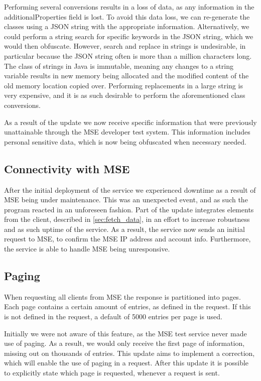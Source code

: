 Performing several conversions results in a loss of data, as any information in the additionalProperties field is lost. To avoid this data loss, we can re-generate the classes using a JSON string with the appropriate information. Alternatively, we could perform a string search for specific keywords in the JSON string, which we would then obfuscate. However, search and replace in strings is undesirable, in particular because the JSON string often is more than a million characters long. The class of strings in Java is immutable, meaning any changes to a string variable results in new memory being allocated and the modified content of the old memory location copied over. Performing replacements in a large string is very expensive, and it is as such desirable to perform the aforementioned class conversions. 

As a result of the update we now receive specific information that were previously unattainable through the MSE developer test system. This information includes personal sensitive data, which is now being obfuscated when necessary needed. 

\subsection{Connectivity with MSE}
After the initial deployment of the service we experienced downtime as a result of MSE being under maintenance. This was an unexpected event, and as such the program reacted in an unforeseen fashion. Part of the update integrates elements from the client, described in \ref{sec:fetch_data}, in an effort to increase robustness and as such uptime of the service. As a result, the service now sends an initial request to MSE, to confirm the MSE IP address and account info. Furthermore, the service is able to handle MSE being unresponsive.

\subsection{Paging}
When requesting all clients from MSE the response is partitioned into pages. Each page contains a certain amount of entries, as defined in the request. If this is not defined in the request, a default of 5000 entries per page is used. 

Initially we were not aware of this feature, as the MSE test service never made use of paging. As a result, we would only receive the first page of information, missing out on thousands of entries. This update aims to implement a correction, which will enable the use of paging in a request. After this update it is possible to explicitly state which page is requested, whenever a request is sent.